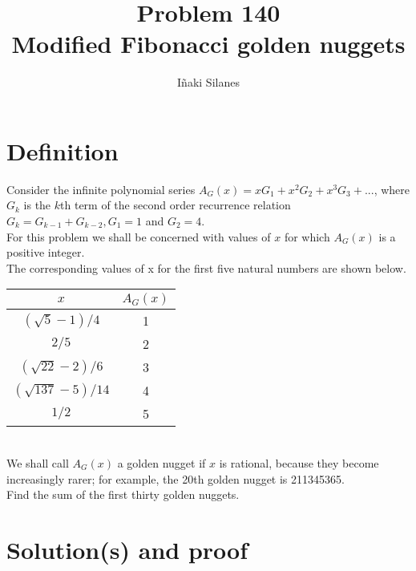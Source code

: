 \documentclass[english]{article}
\begin{document}
\newcommand{\mc}{\multicolumn}
\newcommand{\mr}{\multirow}
\newcommand{\cw}{\columnwidth}
\newcommand{\ig}[2]{\texttt{[image: \#2]}}

\title{Problem 140\\Modified Fibonacci golden nuggets}
\author{I\~naki Silanes}
\maketitle

\section{Definition}

Consider the infinite polynomial series $A_{G}(x) = x G_1 + x^2 G_2 + x^3 G_3 + ...$, where $G_k$ is the $k$th term of the second order recurrence relation $G_k = G_{k-1}+ G_{k-2}, G_1 = 1$ and $G_2 = 4$.\\

For this problem we shall be concerned with values of $x$ for which $A_G(x)$ is a positive integer.\\

The corresponding values of x for the first five natural numbers are shown below.\\

\begin{center}
  \begin{tabular}{cc} \hline
	$x$                 & $A_G(x)$ \\ \hline
	$(\sqrt{5}-1)/4$    & 1 \\
	$2/5$               & 2 \\
	$(\sqrt{22}-2)/6$   & 3 \\
	$(\sqrt{137}-5)/14$ & 4 \\
	$1/2$               & 5 \\ \hline
  \end{tabular}
\end{center}
\ \\

We shall call $A_G(x)$ a golden nugget if $x$ is rational, because they become increasingly rarer; for example, the 20th golden nugget is 211345365.\\

Find the sum of the first thirty golden nuggets.

\section{Solution(s) and proof}
\end{document}

